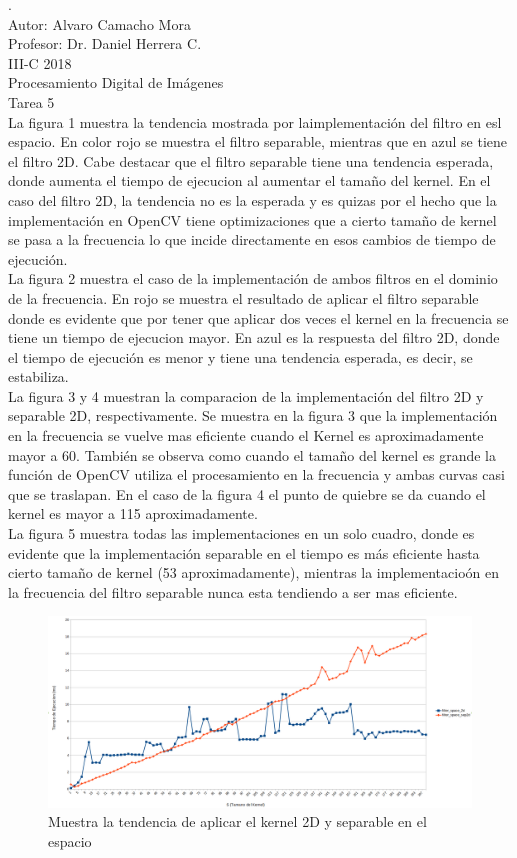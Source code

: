 \documentclass[11 pt,oneside]{article}
\begin{document}
.\\
Autor: Alvaro Camacho Mora\\
Profesor: Dr. Daniel Herrera C.\\
III-C 2018\\
Procesamiento Digital de Im\'agenes\\
Tarea 5
\\

La figura 1 muestra la tendencia mostrada por laimplementaci\'on del filtro en esl espacio. En color rojo se muestra el filtro separable, mientras que en azul se tiene el filtro 2D. Cabe destacar que el filtro separable tiene una tendencia esperada, donde aumenta el tiempo de ejecucion al aumentar el tama\~no del kernel. En el caso del filtro 2D, la tendencia no es la esperada y es quizas por el hecho que la implementaci\'on en OpenCV tiene optimizaciones que a cierto tama\~no de kernel se pasa a la frecuencia lo que incide directamente en esos cambios de tiempo de ejecuci\'on.\\

La figura 2 muestra el caso de la implementaci\'on de ambos filtros en el dominio de la frecuencia. En rojo se muestra el resultado de aplicar el filtro separable donde es evidente que por tener que aplicar dos veces el kernel en la frecuencia se tiene un tiempo de ejecucion mayor. En azul es la respuesta del filtro 2D, donde el tiempo de ejecuci\'on es menor y tiene una tendencia esperada, es decir, se estabiliza.\\

La figura 3 y 4 muestran la comparacion de la implementaci\'on del filtro 2D y separable 2D, respectivamente. Se muestra en la figura 3 que la implementaci\'on en la frecuencia se vuelve mas eficiente cuando el Kernel es aproximadamente mayor a 60. Tambi\'en se observa como cuando el tama\~no del kernel es grande la funci\'on de OpenCV utiliza el procesamiento en la frecuencia y ambas curvas casi que se traslapan. En el caso de la figura 4 el punto de quiebre se da cuando el kernel es mayor a 115 aproximadamente. \\

La figura 5 muestra todas las implementaciones en un solo cuadro, donde es evidente que la implementaci\'on separable en el tiempo es m\'as eficiente hasta cierto tama\~no de kernel (53 aproximadamente), mientras la implementacio\'on en la frecuencia del filtro separable nunca esta tendiendo a ser mas eficiente.
\begin{figure}[H]
\centering
\includegraphics[width=17cm]{espacio}
\caption{Muestra la tendencia de aplicar el kernel 2D y separable en el espacio} \label{fig:2d}
\end{figure} 
\end{document}
